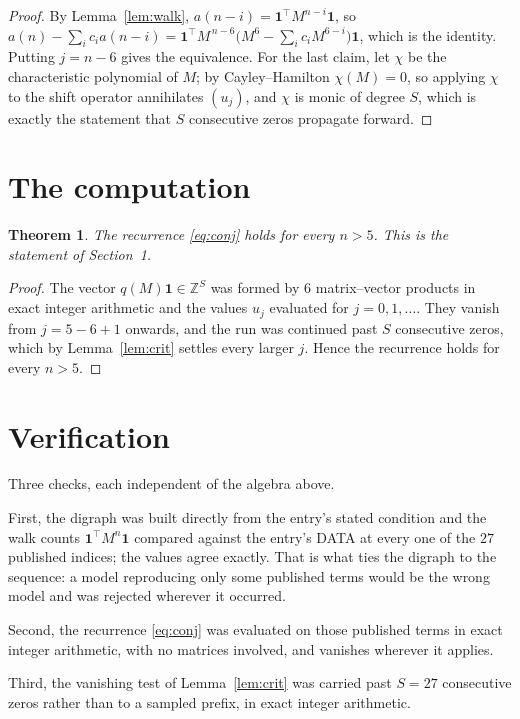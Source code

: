 \documentclass[11pt,a4paper]{article}
\theoremstyle{plain}
\newtheorem{theorem}{Theorem}
\theoremstyle{definition}
\begin{document}
\begin{proof}
By Lemma~\ref{lem:walk}, $a(n-i)=\mathbf{1}^{\!\top}M^{n-i}\mathbf{1}$, so
$a(n)-\sum_i c_i a(n-i)
=\mathbf{1}^{\!\top}M^{\,n-6}\bigl(M^{6}-\sum_i c_i M^{6-i}\bigr)
\mathbf{1}$, which is the identity. Putting $j=n-6$ gives the equivalence. For the
last claim, let $\chi$ be the characteristic polynomial of $M$; by Cayley--Hamilton
$\chi(M)=0$, so applying $\chi$ to the shift operator annihilates $(u_j)$, and $\chi$ is
monic of degree $S$, which is exactly the statement that $S$ consecutive zeros propagate
forward.
\end{proof}

\section{The computation}

\begin{theorem}
The recurrence \eqref{eq:conj} holds for every $n>5$. This is the statement of
Section~1.
\end{theorem}

\begin{proof}
The vector $q(M)\mathbf{1}\in\mathbb{Z}^{S}$ was formed by $6$ matrix--vector
products in exact integer arithmetic and the values $u_j$ evaluated for
$j=0,1,\dots$. They vanish from $j=5-6+1$ onwards, and the run was continued past
$S$ consecutive zeros, which by Lemma~\ref{lem:crit} settles every larger $j$. Hence the
recurrence holds for every $n>5$.
\end{proof}

\section{Verification}

Three checks, each independent of the algebra above.

First, the digraph was built directly from the entry's stated condition and the walk counts
$\mathbf{1}^{\!\top}M^{n}\mathbf{1}$ compared against the entry's DATA at every one of
the $27$ published indices; the values agree exactly. That is what ties the digraph to
the sequence: a model reproducing only some published terms would be the wrong model and
was rejected wherever it occurred.

Second, the recurrence \eqref{eq:conj} was evaluated on those published terms in exact
integer arithmetic, with no matrices involved, and vanishes wherever it applies.

Third, the vanishing test of Lemma~\ref{lem:crit} was carried past $S=27$ consecutive
zeros rather than to a sampled prefix, in exact integer arithmetic.
\end{document}
